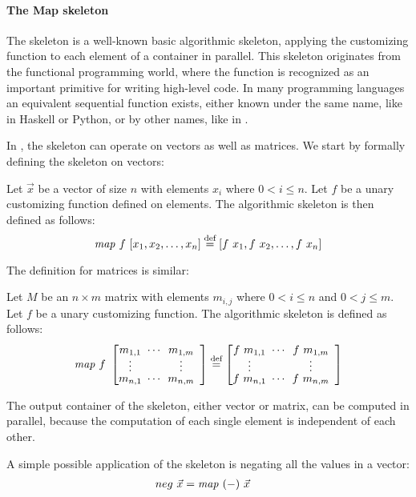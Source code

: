 
\paragraph{The Map skeleton}
The \map skeleton is a well-known basic algorithmic skeleton, applying the customizing function to each element of a container in parallel.
This skeleton originates from the functional programming world, where the  function is recognized as an important primitive for writing high-level code.
In many programming languages an equivalent sequential function exists, either known under the same name, like in Haskell or Python, or by other names, like  in \Cpp.

In \SkelCL, the \map skeleton can operate on vectors as well as matrices.
We start by formally defining the skeleton on vectors:
\begin{definition}
  \label{definition:map}
  Let $\vec{x}$ be a vector of size $n$ with elements $x_i$ where $0 < i \leq n$.
  Let $f$ be a unary customizing function defined on elements.
  The algorithmic skeleton \map is then defined as follows:
  \begin{equation*}
    \map\ f\ [x_1, x_2, \dots, x_n] \eqdef [f\ x_1, f\ x_2, \dots, f\ x_n]
  \end{equation*}
\end{definition}
\noindent
The definition for matrices is similar:
\begin{definition}
  \label{definition:map:matrix}
  Let $M$ be an $n\times m$ matrix with elements $m_{i,j}$ where $0 < i \leq n$ and $0 < j \leq m$.
  Let $f$ be a unary customizing function.
  The algorithmic skeleton \map is defined as follows:
  \begin{equation*}
    \map\ f\ \DottedMatrix{m_{1,1}}{m_{1,m}}{m_{n,1}}{m_{n,m}}
      \eqdef \DottedMatrix{f\ m_{1,1}}{f\ m_{1,m}}{f\ m_{n,1}}{f\ m_{n,m}}
  \end{equation*}
\end{definition}
\noindent
The output container of the \map skeleton, either vector or matrix, can be computed in parallel, because the computation of each single element is independent of each other.

A simple possible application of the \map skeleton is negating all the values in a vector:
\begin{align*}
  neg\ \vec{x} &= \text{\textit{map}}\ (-)\ \vec{x}
\end{align*}


